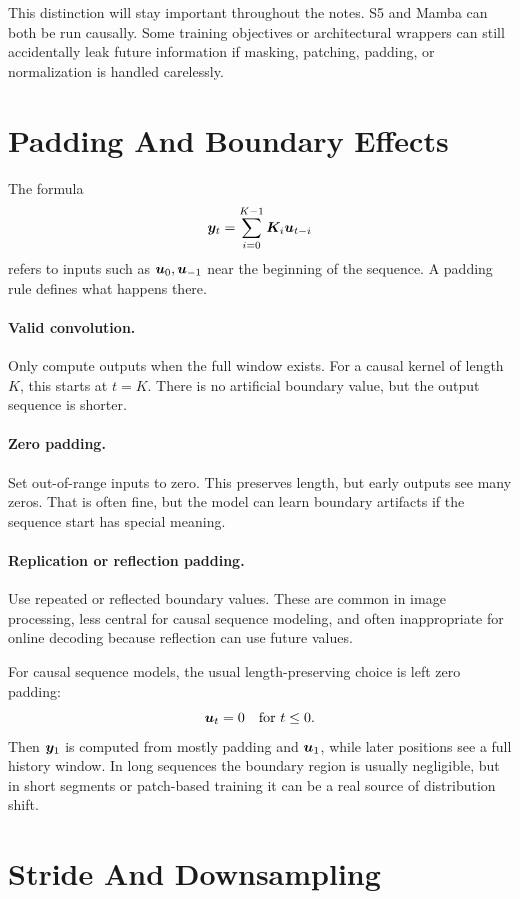 This distinction will stay important throughout the notes. S5 and Mamba can both be run
causally. Some training objectives or architectural wrappers can still accidentally leak
future information if masking, patching, padding, or normalization is handled carelessly.

\section{Padding And Boundary Effects}

The formula
\[
  \bm{y}_t = \sum_{i=0}^{K-1} \bm{K}_i \bm{u}_{t-i}
\]
refers to inputs such as $\bm{u}_0,\bm{u}_{-1}$ near the beginning of the sequence. A padding
rule defines what happens there.

\paragraph{Valid convolution.}
Only compute outputs when the full window exists. For a causal kernel of length $K$, this
starts at $t=K$. There is no artificial boundary value, but the output sequence is shorter.

\paragraph{Zero padding.}
Set out-of-range inputs to zero. This preserves length, but early outputs see many zeros.
That is often fine, but the model can learn boundary artifacts if the sequence start has
special meaning.

\paragraph{Replication or reflection padding.}
Use repeated or reflected boundary values. These are common in image processing, less
central for causal sequence modeling, and often inappropriate for online decoding because
reflection can use future values.

For causal sequence models, the usual length-preserving choice is left zero padding:
\[
  \bm{u}_t = 0 \quad \text{for } t \leq 0.
\]
Then $\bm{y}_1$ is computed from mostly padding and $\bm{u}_1$, while later positions see a full
history window. In long sequences the boundary region is usually negligible, but in short
segments or patch-based training it can be a real source of distribution shift.

\section{Stride And Downsampling}

